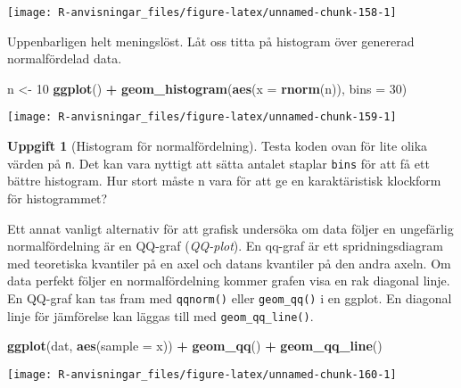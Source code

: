 \documentclass[
]{book}
\newenvironment{Shaded}{\begin{snugshade}}{\end{snugshade}}
\newcommand{\AttributeTok}[1]{\textcolor[rgb]{0.13,0.29,0.53}{#1}}
\newcommand{\DecValTok}[1]{\textcolor[rgb]{0.00,0.00,0.81}{#1}}
\newcommand{\FunctionTok}[1]{\textcolor[rgb]{0.13,0.29,0.53}{\textbf{#1}}}
\newcommand{\NormalTok}[1]{#1}
\newcommand{\OtherTok}[1]{\textcolor[rgb]{0.56,0.35,0.01}{#1}}
\newcommand{\SpecialCharTok}[1]{\textcolor[rgb]{0.81,0.36,0.00}{\textbf{#1}}}
\theoremstyle{definition}
\theoremstyle{definition}
\theoremstyle{definition}
\newtheorem{exercise}{Uppgift}[chapter]
\theoremstyle{definition}
\theoremstyle{remark}
\begin{document}
\begin{center}\texttt{[image: R-anvisningar\_files/figure-latex/unnamed-chunk-158-1]} \end{center}

Uppenbarligen helt meningslöst. Låt oss titta på histogram över genererad normalfördelad data.

\begin{Shaded}
\begin{Highlighting}[]
\NormalTok{n }\OtherTok{\textless{}{-}} \DecValTok{10}
\FunctionTok{ggplot}\NormalTok{() }\SpecialCharTok{+} \FunctionTok{geom\_histogram}\NormalTok{(}\FunctionTok{aes}\NormalTok{(}\AttributeTok{x =} \FunctionTok{rnorm}\NormalTok{(n)), }\AttributeTok{bins =} \DecValTok{30}\NormalTok{)}
\end{Highlighting}
\end{Shaded}

\begin{center}\texttt{[image: R-anvisningar\_files/figure-latex/unnamed-chunk-159-1]} \end{center}

\begin{exercise}[Histogram för normalfördelning]
Testa koden ovan för lite olika värden på \texttt{n}. Det kan vara nyttigt att sätta antalet staplar \texttt{bins} för att få ett bättre histogram. Hur stort måste n vara för att ge en karaktäristisk klockform för histogrammet?
\end{exercise}

Ett annat vanligt alternativ för att grafisk undersöka om data följer en ungefärlig normalfördelning är en QQ-graf (\emph{QQ-plot}). En qq-graf är ett spridningsdiagram med teoretiska kvantiler på en axel och datans kvantiler på den andra axeln. Om data perfekt följer en normalfördelning kommer grafen visa en rak diagonal linje. En QQ-graf kan tas fram med \texttt{qqnorm()} eller \texttt{geom\_qq()} i en ggplot. En diagonal linje för jämförelse kan läggas till med \texttt{geom\_qq\_line()}.

\begin{Shaded}
\begin{Highlighting}[]
\FunctionTok{ggplot}\NormalTok{(dat, }\FunctionTok{aes}\NormalTok{(}\AttributeTok{sample =}\NormalTok{ x)) }\SpecialCharTok{+} \FunctionTok{geom\_qq}\NormalTok{() }\SpecialCharTok{+} \FunctionTok{geom\_qq\_line}\NormalTok{()}
\end{Highlighting}
\end{Shaded}

\begin{center}\texttt{[image: R-anvisningar\_files/figure-latex/unnamed-chunk-160-1]} \end{center}
\end{document}
